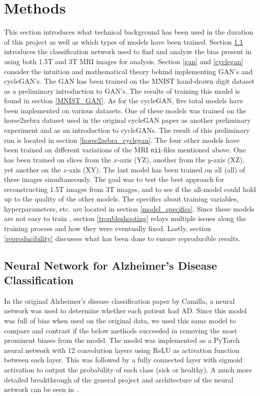 \documentclass[12pt, fleqn, titlepage]{article}
\begin{document}
\section{Methods}
This section introduces what technical background has been used in the duration of this project as well as which types of models have been trained. Section \ref{camillas_model} introduces the classification network used to find and analyze the bias present in using both 1.5T and 3T MRI images for analysis. Section \ref{gan} and \ref{cyclegan} consider the intuition and mathematical theory behind implementing GAN's and cycleGAN's. The GAN has been trained on the MNIST hand-drawn digit dataset as a preliminary introduction to GAN's. The results of training this model is found in section \ref{MNIST_GAN}. As for the cycleGAN, five total models have been implemented on various datasets. One of these models was trained on the horse2zebra dataset used in the original cycleGAN paper \cite{original_cyclegan} as another preliminary experiment and as an introduction to cycleGANs. The result of this preliminary run is located in section \ref{horse2zebra_cyclegan}. The four other models have been trained on different variations of the MRI \texttt{nii}-files %
 mentioned above. One has been trained on slices from the $x$-axis (YZ), another from the $y$-axis (XZ), yet another on the $z$-axis (XY). The last model has been trained on all (all) of these images simultaneously. The goal was to test the best approach for reconstructing 1.5T images from 3T images, and to see if the all-model could hold up to the quality of the other models. The specifics about training variables, hyperparameters, etc. are located in section \ref{model_specifics}. Since these models are not easy to train \cite{hard_to_train}, section \ref{troubleshooting} relays multiple issues along the training process and how they were eventually fixed. Lastly, section \ref{reproducibility} discusses what has been done to ensure reproducible results.

\subsection{Neural Network for Alzheimer's Disease Classification} \label{camillas_model}
In the original Alzheimer's disease classification paper by Camilla, a neural network was used to determine whether each patient had AD. Since this model was full of bias when used on the original data, we used this same model to compare and contrast if the below methods succeeded in removing the most prominent biases from the model. The model was implemented as a PyTorch neural network with 12 convolution layers using ReLU as activation function between each layer. This was followed by a fully connected layer with sigmoid activation to output the probability of each class (sick or healthy). A much more detailed breakthrough of the general project and architecture of the neural network can be seen in \cite{CamillaKandidat}.
\end{document}
